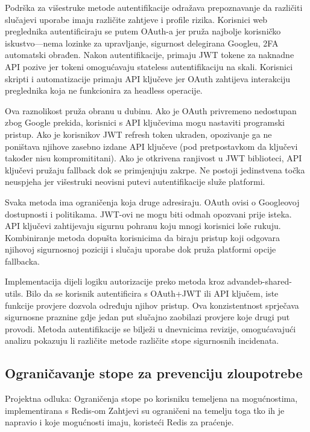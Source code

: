 \documentclass[12pt,a4paper]{article}
\begin{document}

Podrška za višestruke metode autentifikacije odražava prepoznavanje da različiti slučajevi uporabe imaju različite zahtjeve i profile rizika. Korisnici web preglednika autentificiraju se putem OAuth-a jer pruža najbolje korisničko iskustvo—nema lozinke za upravljanje, sigurnost delegirana Googleu, 2FA automatski obrađen. Nakon autentifikacije, primaju JWT tokene za naknadne API pozive jer tokeni omogućavaju stateless autentifikaciju na skali. Korisnici skripti i automatizacije primaju API ključeve jer OAuth zahtijeva interakciju preglednika koja ne funkcionira za headless operacije.

Ova raznolikost pruža obranu u dubinu. Ako je OAuth privremeno nedostupan zbog Google prekida, korisnici s API ključevima mogu nastaviti programski pristup. Ako je korisnikov JWT refresh token ukraden, opozivanje ga ne poništava njihove zasebno izdane API ključeve (pod pretpostavkom da ključevi također nisu kompromititani). Ako je otkrivena ranjivost u JWT biblioteci, API ključevi pružaju fallback dok se primjenjuju zakrpe. Ne postoji jedinstvena točka neuspjeha jer višestruki neovisni putevi autentifikacije služe platformi.

Svaka metoda ima ograničenja koja druge adresiraju. OAuth ovisi o Googleovoj dostupnosti i politikama. JWT-ovi ne mogu biti odmah opozvani prije isteka. API ključevi zahtijevaju sigurnu pohranu koju mnogi korisnici loše rukuju. Kombiniranje metoda dopušta korisnicima da biraju pristup koji odgovara njihovoj sigurnosnoj poziciji i slučaju uporabe dok pruža platformi opcije fallbacka.

Implementacija dijeli logiku autorizacije preko metoda kroz advandeb-shared-utils. Bilo da se korisnik autentificira s OAuth+JWT ili API ključem, iste funkcije provjere dozvola određuju njihov pristup. Ova konzistentnost sprječava sigurnosne praznine gdje jedan put slučajno zaobilazi provjere koje drugi put provodi. Metoda autentifikacije se bilježi u dnevnicima revizije, omogućavajući analizu pokazuju li različite metode različite stope sigurnosnih incidenata.

\subsection{Ograničavanje stope za prevenciju zloupotrebe}

\begin{rationale}{Projektna odluka: Ograničenja stope po korisniku temeljena na mogućnostima, implementirana s Redis-om}
Zahtjevi su ograničeni na temelju toga tko ih je napravio i koje mogućnosti imaju, koristeći Redis za praćenje.
\end{rationale}
\end{document}
